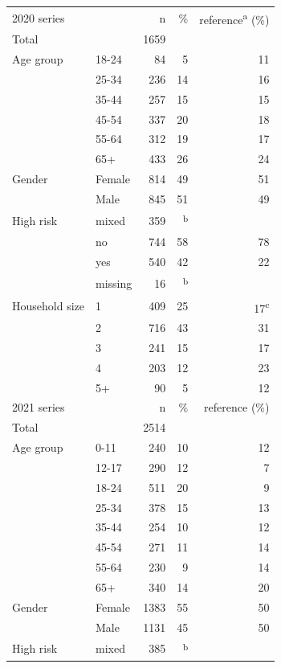 \documentclass[fleqn,10pt]{wlscirep}
\begin{document}
\begin{table}[ht]
\centering
\begin{tabular}{llrrr}
  \hline
  \hline
  2020 series & & n & \% & reference\textsuperscript{a} (\%) \\ 
  Total & & 1659 & & \\
  \hline
  Age group & 18-24 & 84 & 5 & 11 \\ 
   & 25-34 & 236 & 14 & 16 \\ 
   & 35-44 & 257 & 15 & 15 \\ 
   & 45-54 & 337 & 20 & 18 \\ 
   & 55-64 & 312 & 19 & 17 \\ 
   & 65+ & 433 & 26 & 24 \\ 
  \hline
  Gender & Female & 814 & 49 & 51 \\ 
   & Male & 845 & 51 & 49 \\ 
  \hline
  High risk & mixed & 359 & \textsuperscript{b} &  \\ 
   & no & 744 & 58 & 78 \\ 
   & yes & 540 & 42 & 22 \\ 
   & missing & 16 & \textsuperscript{b} &  \\ 
  \hline
  Household size & 1 & 409 & 25 & 17\textsuperscript{c} \\ 
   & 2 & 716 & 43 & 31 \\ 
   & 3 & 241 & 15 & 17 \\ 
   & 4 & 203 & 12 & 23 \\ 
   & 5+ & 90 & 5 & 12 \\ 
  \hline
  \hline
  2021 series & & n & \% & reference (\%) \\ 
  Total & & 2514 & & \\
  \hline
  Age group & 0-11 & 240 & 10 & 12 \\ 
   & 12-17 & 290 & 12 & 7 \\ 
   & 18-24 & 511 & 20 & 9 \\ 
   & 25-34 & 378 & 15 & 13 \\ 
   & 35-44 & 254 & 10 & 12 \\ 
   & 45-54 & 271 & 11 & 14 \\ 
   & 55-64 & 230 & 9 & 14 \\ 
   & 65+ & 340 & 14 & 20 \\ 
  \hline
  Gender & Female & 1383 & 55 & 50 \\ 
   & Male & 1131 & 45 & 50 \\ 
  \hline
  High risk & mixed & 385 & \textsuperscript{b} &  \\ 

\end{tabular}
\end{table}
\end{document}
